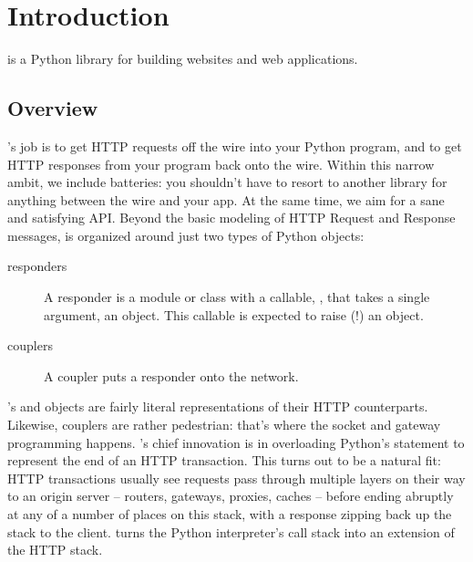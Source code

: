 \chapter{Introduction}

 is a Python library for building websites and web applications.



\section{Overview}

's job is to get HTTP requests off the wire into your Python
program, and to get HTTP responses from your program back onto the wire. Within
this narrow ambit, we include batteries: you shouldn't have to resort to another
library for anything between the wire and your app. At the same time, we aim for
a sane and satisfying API. Beyond the basic modeling of HTTP Request and
Response messages,  is organized around just two types of Python
objects:

\begin{description}

\item[responders]
    {A responder is a module or class with a callable, , that
    takes a single argument, an  object. This callable is
    expected to raise (!) an  object.}

\item[couplers]
    {A coupler puts a responder onto the network.}

\end{description}

's  and  objects are fairly literal
representations of their HTTP counterparts. Likewise, couplers are rather
pedestrian: that's where the socket and gateway programming happens.
's chief innovation is in overloading Python's 
statement to represent the end of an HTTP transaction. This turns out to be a
natural fit: HTTP transactions usually see requests pass through multiple layers
on their way to an origin server -- routers, gateways, proxies, caches -- before
ending abruptly at any of a number of places on this stack, with a response
zipping back up the stack to the client.  turns the Python
interpreter's call stack into an extension of the HTTP stack.



